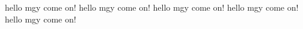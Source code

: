 hello mgy  come on!
hello mgy  come on!
hello mgy  come on!
hello mgy  come on!
hello mgy  come on!

